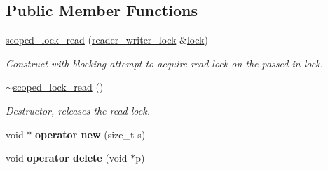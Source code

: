 \subsection*{Public Member Functions}
\begin{DoxyCompactItemize}
\item 
\hypertarget{classtbb_1_1interface5_1_1reader__writer__lock_1_1scoped__lock__read_a9d3120a23016dabd4cc2683fa561ee5a}{}\hyperlink{classtbb_1_1interface5_1_1reader__writer__lock_1_1scoped__lock__read_a9d3120a23016dabd4cc2683fa561ee5a}{scoped\+\_\+lock\+\_\+read} (\hyperlink{classtbb_1_1interface5_1_1reader__writer__lock}{reader\+\_\+writer\+\_\+lock} \&\hyperlink{classtbb_1_1interface5_1_1reader__writer__lock_a2368b20444e310be9f8f3cf24337acc7}{lock})\label{classtbb_1_1interface5_1_1reader__writer__lock_1_1scoped__lock__read_a9d3120a23016dabd4cc2683fa561ee5a}

\begin{DoxyCompactList}\small\item\em Construct with blocking attempt to acquire read lock on the passed-\/in lock. \end{DoxyCompactList}\item 
\hypertarget{classtbb_1_1interface5_1_1reader__writer__lock_1_1scoped__lock__read_acf0e23fb4d3aeb6bde18d5d1236bd9d5}{}\hyperlink{classtbb_1_1interface5_1_1reader__writer__lock_1_1scoped__lock__read_acf0e23fb4d3aeb6bde18d5d1236bd9d5}{$\sim$scoped\+\_\+lock\+\_\+read} ()\label{classtbb_1_1interface5_1_1reader__writer__lock_1_1scoped__lock__read_acf0e23fb4d3aeb6bde18d5d1236bd9d5}

\begin{DoxyCompactList}\small\item\em Destructor, releases the read lock. \end{DoxyCompactList}\item 
\hypertarget{classtbb_1_1interface5_1_1reader__writer__lock_1_1scoped__lock__read_a9eb8c7a64912a1c74ea76a01a20a1621}{}void $\ast$ {\bfseries operator new} (size\+\_\+t s)\label{classtbb_1_1interface5_1_1reader__writer__lock_1_1scoped__lock__read_a9eb8c7a64912a1c74ea76a01a20a1621}

\item 
\hypertarget{classtbb_1_1interface5_1_1reader__writer__lock_1_1scoped__lock__read_a1a6c15dfdbe1bc7a6648ed836ebd8de6}{}void {\bfseries operator delete} (void $\ast$p)\label{classtbb_1_1interface5_1_1reader__writer__lock_1_1scoped__lock__read_a1a6c15dfdbe1bc7a6648ed836ebd8de6}

\end{DoxyCompactItemize}
